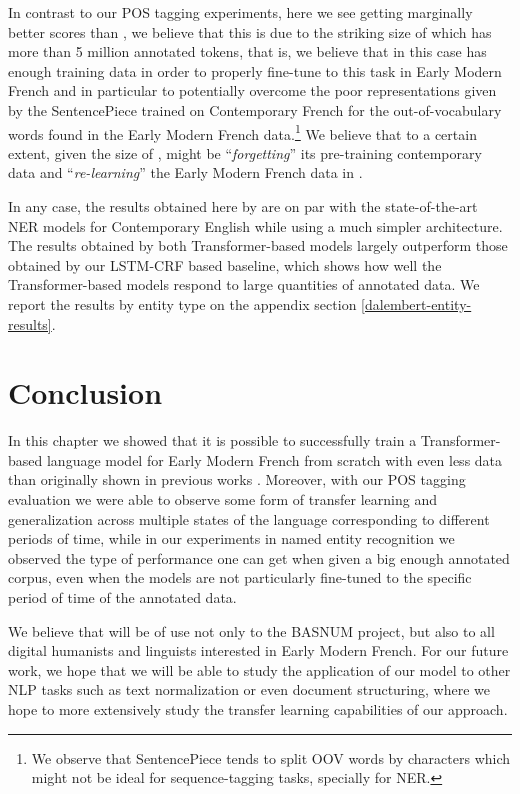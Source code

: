 In contrast to our POS tagging experiments, here we see \dalembert getting marginally better scores than \dalembert, we believe that this is due to the striking size of \freemner which has more than 5 million annotated tokens, that is, we believe that in this case \camembert has enough training data in order to properly fine-tune to this task in Early Modern French and in particular to potentially overcome the poor representations given by the SentencePiece \citep{kudo-richardson-2018-sentencepiece} trained on Contemporary French for the out-of-vocabulary words found in the Early Modern French data.\footnote{We observe that SentencePiece tends to split OOV words by characters which might not be ideal for sequence-tagging tasks, specially for NER.} We believe that to a certain extent, given the size of \freemner, \camembert might be \enquote{\emph{forgetting}} its pre-training contemporary data and \enquote{\emph{re-learning}} the Early Modern French data in \freemner.

In any case, the results obtained here by \dalembert are on par with the state-of-the-art NER models for Contemporary English \citep{wang-etal-2021-automated} while using a much simpler architecture. The results obtained by both Transformer-based models largely outperform those obtained by our LSTM-CRF based baseline, which shows how well the Transformer-based models respond to large quantities of annotated data. We report the results by entity type on the appendix section \ref{dalembert-entity-results}.

\section{Conclusion}

In this chapter we showed that it is possible to successfully train a Transformer-based language model for Early Modern French from scratch with even less data than originally shown in previous works \citep{martin-etal-2020-camembert}. Moreover, with our POS tagging evaluation we were able to observe some form of transfer learning and generalization across multiple states of the language corresponding to different periods of time, while in our experiments in named entity recognition we observed the type of performance one can get when given a big enough annotated corpus, even when the models are not particularly fine-tuned to the specific period of time of the annotated data.

We believe that \dalembert will be of use not only to the BASNUM project, but also to all digital humanists and linguists interested in Early Modern French. For our future work, we hope that we will be able to study the application of our \dalembert model to other NLP tasks such as text normalization or even document structuring, where we hope to more extensively study the transfer learning capabilities of our approach.

